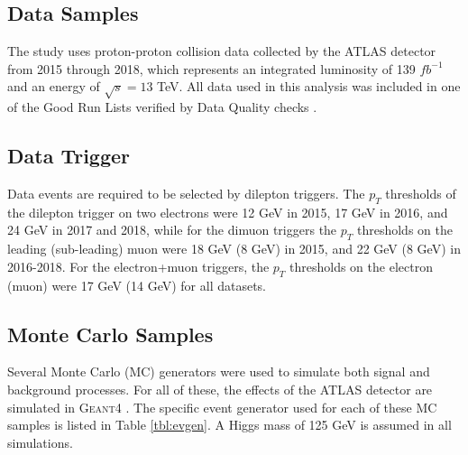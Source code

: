 
\subsection{Data Samples}

The study uses proton-proton collision data collected by the ATLAS detector from 2015 through 2018, which represents an integrated luminosity of 139 $fb^{-1}$ \cite{lumi} and an energy of $\sqrt{s} = 13$ TeV. All data used in this analysis was included in one of the Good Run Lists verified by Data Quality checks \cite{PERF-2010-01}.

\subsection{Data Trigger}

Data events are required to be selected by dilepton triggers. The $p_T$ thresholds of the dilepton trigger on two electrons were 12 GeV in 2015, 17 GeV in 2016, and 24 GeV in 2017 and 2018, while for the dimuon triggers the $p_T$ thresholds on the leading (sub-leading) muon were 18 GeV (8 GeV) in 2015, and 22 GeV (8 GeV) in 2016-2018. For the electron+muon triggers, the $p_T$ thresholds on the electron (muon) were 17 GeV (14 GeV) for all datasets.

\subsection{Monte Carlo Samples}
\label{sec:MCsamples}

Several Monte Carlo (MC) generators were used to simulate both signal and background processes. For all of these, the effects of the ATLAS detector are simulated in \textsc{Geant4} \cite{GEANT4}. The specific event generator used for each of these MC samples is listed in Table \ref{tbl:evgen}. A Higgs mass of 125 GeV is assumed in all simulations.

